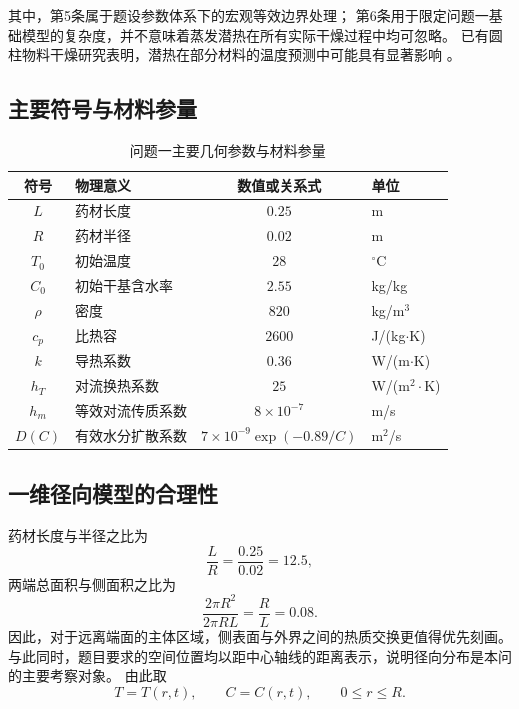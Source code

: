 \documentclass[UTF8,a4paper,12pt]{ctexart}
\begin{document}
其中，第5条属于题设参数体系下的宏观等效边界处理；
第6条用于限定问题一基础模型的复杂度，并不意味着蒸发潜热在所有实际干燥过程中均可忽略。
已有圆柱物料干燥研究表明，潜热在部分材料的温度预测中可能具有显著影响
\cite{dasilva2014}。

\subsection{主要符号与材料参量}

\begin{table}[H]
\centering
\caption{问题一主要几何参数与材料参量}
\begin{tabular}{clcl}
\toprule
符号 & 物理意义 & 数值或关系式 & 单位\\
\midrule
$L$ & 药材长度 & $0.25$ & m\\
$R$ & 药材半径 & $0.02$ & m\\
$T_0$ & 初始温度 & $28$ & $^\circ$C\\
$C_0$ & 初始干基含水率 & $2.55$ & kg/kg\\
$\rho$ & 密度 & $820$ & kg/m$^3$\\
$c_p$ & 比热容 & $2600$ & J/(kg$\cdot$K)\\
$k$ & 导热系数 & $0.36$ & W/(m$\cdot$K)\\
$h_T$ & 对流换热系数 & $25$ & W/(m$^2\cdot$K)\\
$h_m$ & 等效对流传质系数 & $8\times10^{-7}$ & m/s\\
$D(C)$ & 有效水分扩散系数 &
$7\times10^{-9}\exp(-0.89/C)$ & m$^2$/s\\
\bottomrule
\end{tabular}
\end{table}

\subsection{一维径向模型的合理性}

药材长度与半径之比为
\begin{equation}
\frac{L}{R}=\frac{0.25}{0.02}=12.5,
\end{equation}
两端总面积与侧面积之比为
\begin{equation}
\frac{2\pi R^2}{2\pi RL}
=\frac{R}{L}
=0.08.
\end{equation}
因此，对于远离端面的主体区域，侧表面与外界之间的热质交换更值得优先刻画。
与此同时，题目要求的空间位置均以距中心轴线的距离表示，说明径向分布是本问的主要考察对象。
由此取
\begin{equation}
T=T(r,t),\qquad C=C(r,t),\qquad 0\le r\le R.
\end{equation}
\end{document}
